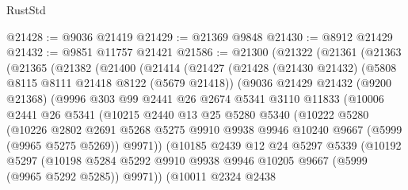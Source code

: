 \begin{lexlean}{RustStd}
\begin{coremodule}
@21428 := @9036 @21419
@21429 := @21369 @9848
@21430 := @8912 @21429
@21432 := @9851 @11757 @21421
@21586 := @21300
    (@21322
      (@21361
        (@21363
          (@21365
            (@21382
              (@21400
                (@21414
                  (@21427
                    (@21428
                      (@21430 @21432)
                      (@5808 @8115 @8111 @21418 @8122 (@5679 @21418))
                      (@9036
                        @21429
                        @21432
                        (@9200 @21368)
                        (@9996
                          @303
                          @99
                          @2441
                          @26
                          @2674
                          @5341
                          @3110
                          @11833
                          (@10006
                            @2441
                            @26
                            @5341
                            (@10215
                              @2440
                              @13
                              @25
                              @5280
                              @5340
                              (@10222
                                @5280
                                (@10226
                                  @2802
                                  @2691
                                  @5268
                                  @5275
                                  @9910
                                  @9938
                                  @9946
                                  @10240
                                  @9667
                                  (@5999 (@9965 @5275 @5269))
                                  @9971))
                              (@10185
                                @2439
                                @12
                                @24
                                @5297
                                @5339
                                (@10192
                                  @5297
                                  (@10198
                                    @5284
                                    @5292
                                    @9910
                                    @9938
                                    @9946
                                    @10205
                                    @9667
                                    (@5999 (@9965 @5292 @5285))
                                    @9971))
                                (@10011
                                  @2324
                                  @2438

\end{coremodule}
\end{lexlean}
